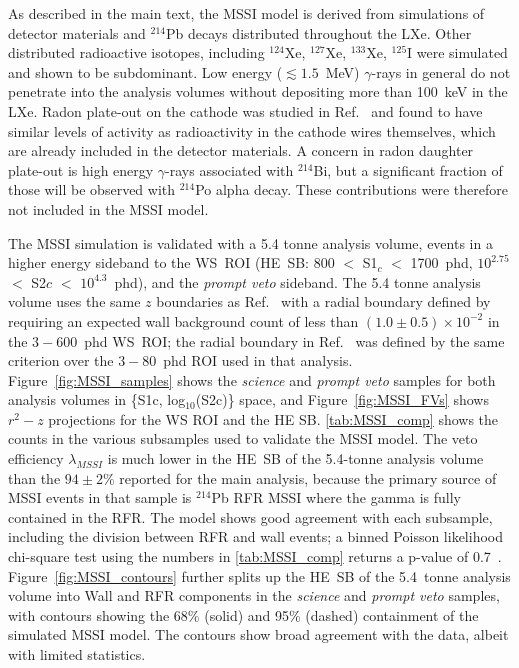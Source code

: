 As described in the main text, the MSSI model is derived from simulations of detector materials  and $^{214}$Pb decays distributed throughout the LXe. Other distributed radioactive isotopes, including $^{124}$Xe, $^{127}$Xe, $^{133}$Xe, $^{125}$I were simulated and shown to be subdominant. Low energy ($\lesssim 1.5$~MeV) $\gamma$-rays in general do not penetrate into the analysis volumes without depositing more than 100~keV in the LXe. Radon plate-out on the cathode was studied in Ref.~\cite{LZ:2026hpq} and found to have similar levels of activity as radioactivity in the cathode wires themselves, which are already included in the detector materials. A concern in radon daughter plate-out is high energy $\gamma$-rays associated with $^{214}$Bi, but a significant fraction of those will be observed with $^{214}$Po alpha decay. These contributions were therefore not included in the MSSI model. 




The MSSI simulation is validated with a 5.4 tonne analysis volume, events in a higher energy sideband to the WS~ROI (HE~SB: 800 $<$ S1$_c$ $<$ 1700~phd, $10^{2.75}$ $<$ S2$c$ $<$ $10^{4.3}$~phd), and the \emph{prompt veto} sideband.  The 5.4 tonne analysis volume uses the same $z$ boundaries as Ref.~\cite{LZ:SR3_WS2024} with a radial boundary defined by requiring an expected wall background count of less than $(1.0 \pm 0.5)\times10^{-2}$ in the $3-600$~phd WS~ROI; the radial boundary in Ref.~\cite{LZ:SR3_WS2024} was defined by the same criterion over the $3-80$~phd ROI used in that analysis. 
Figure~\ref{fig:MSSI_samples} shows the \emph{science} and \emph{prompt veto} samples for both analysis volumes in \{S1c, log$_{10}$(S2c)\} space, and Figure~\ref{fig:MSSI_FVs} shows $r^2-z$ projections for the WS ROI and the HE SB. 
\autoref{tab:MSSI_comp} shows the counts in the various subsamples used to validate the MSSI model. The veto efficiency $\lambda_{MSSI}$ is much lower in the HE~SB of the 5.4-tonne analysis volume than the $94\pm2$\% reported for the main analysis, because the primary source of MSSI events in that sample is $^{214}$Pb RFR MSSI where the gamma is fully contained in the RFR.
The model shows good agreement with each subsample, including the division between RFR and wall events; a binned Poisson likelihood chi-square test using the numbers in \autoref{tab:MSSI_comp} returns a p-value of 0.7~\cite{BAKER1984437}.
Figure~\ref{fig:MSSI_contours} further splits up the HE~SB of the 5.4~tonne analysis volume into Wall and RFR components in the \emph{science} and \emph{prompt veto} samples, with contours showing the 68\% (solid) and 95\% (dashed) containment of the simulated MSSI model.
The contours show broad agreement with the data, albeit with limited statistics. %

